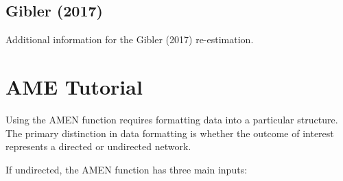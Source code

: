 \subsection*{Gibler (2017)}

Additional information for the Gibler (2017) re-estimation. 


\FloatBarrier

\FloatBarrier
\clearpage

\section{AME Tutorial}

Using the AMEN function requires formatting data into a particular structure. The primary distinction in data formatting is whether the outcome of interest represents a directed or undirected network. 

If undirected, the AMEN function has three main inputs:

